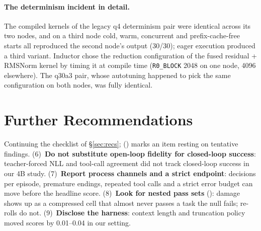 \paragraph{The determinism incident in detail.} The compiled kernels of the legacy q4 determinism pair were identical across its two nodes, and on a third node cold, warm, concurrent and prefix-cache-free starts all reproduced the second node's output (30/30); eager execution produced a third variant. Inductor chose the reduction configuration of the fused residual + RMSNorm kernel by timing it at compile time (\texttt{R0\_BLOCK} 2048 on one node, 4096 elsewhere). The q30a3 pair, whose autotuning happened to pick the same configuration on both nodes, was fully identical.

\section{Further Recommendations}
\label{app:recs}

Continuing the checklist of \S\ref{sec:recs}; (\textdagger) marks an item resting on tentative findings.
(6)~\textbf{Do not substitute open-loop fidelity for closed-loop success}: teacher-forced NLL and tool-call agreement did not track closed-loop success in our 4B study.
(7)~\textbf{Report process channels and a strict endpoint}: decisions per episode, premature endings, repeated tool calls and a strict error budget can move before the headline score.
(8)~\textbf{Look for nested pass sets} (\textdagger): damage shows up as a compressed cell that almost never passes a task the null fails; re-rolls do not.
(9)~\textbf{Disclose the harness}: context length and truncation policy moved scores by 0.01--0.04 in our setting.
